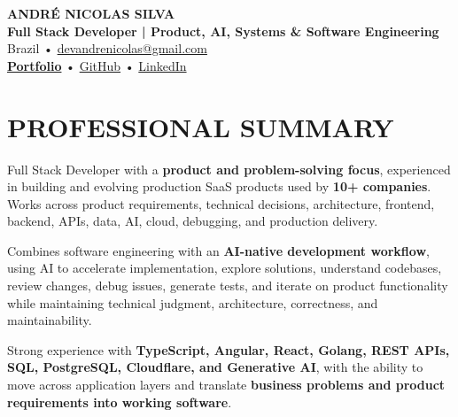 \documentclass[10pt,a4paper]{article}
\begin{document}

\begin{center}

    {\LARGE \textbf{ANDRÉ NICOLAS SILVA}} \\[-2pt]

    {\normalsize \textbf{Full Stack Developer | Product, AI, Systems \& Software Engineering}} \\[1pt]

    \footnotesize
    Brazil \quad • \quad
    \href{mailto:devandrenicolas@gmail.com}{devandrenicolas@gmail.com} \\[-1pt]

    \textbf{\href{https://portfolio-andrenicolas.vercel.app}{Portfolio}}
    \quad • \quad
    \href{https://github.com/devAndreNicolas}{GitHub}
    \quad • \quad
    \href{https://www.linkedin.com/in/devandrenicolas}{LinkedIn}

\end{center}

\vspace{-3pt}


\section*{PROFESSIONAL SUMMARY}

\footnotesize

Full Stack Developer with a \textbf{product and problem-solving focus},
experienced in building and evolving production SaaS products used by
\textbf{10+ companies}. Works across product requirements, technical
decisions, architecture, frontend, backend, APIs, data, AI, cloud,
debugging, and production delivery.

Combines software engineering with an \textbf{AI-native development
workflow}, using AI to accelerate implementation, explore solutions,
understand codebases, review changes, debug issues, generate tests,
and iterate on product functionality while maintaining technical
judgment, architecture, correctness, and maintainability.

Strong experience with \textbf{TypeScript, Angular, React, Golang,
REST APIs, SQL, PostgreSQL, Cloudflare, and Generative AI}, with the
ability to move across application layers and translate
\textbf{business problems and product requirements into working
software}.
\end{document}
